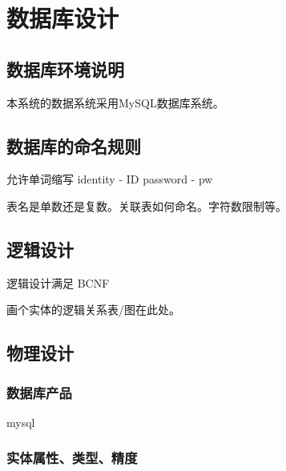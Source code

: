 \chapter{数据库设计}
\section{数据库环境说明}


本系统的数据系统采用MySQL数据库系统。

\section{数据库的命名规则}
允许单词缩写
identity - ID
password - pw

表名是单数还是复数。关联表如何命名。字符数限制等。


\section{逻辑设计}
逻辑设计满足 BCNF

画个实体的逻辑关系表/图在此处。

\section{物理设计}
\subsection{数据库产品}
mysql

\subsection{实体属性、类型、精度}

